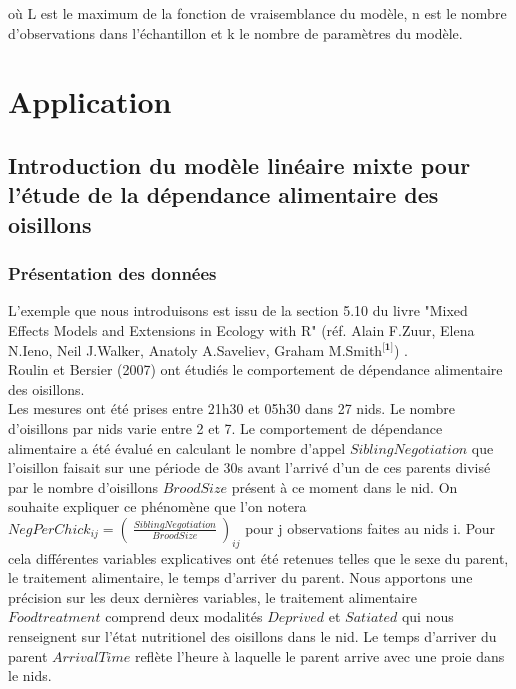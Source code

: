 \documentclass[11pt,fleqn]{book} %
\begin{document}
	où L est le maximum de la fonction de vraisemblance du modèle, n est le nombre d'observations dans l'échantillon et k le nombre de paramètres du modèle.
	
	
	
	\newpage
	
	
	
	\chapter{Application}
	
	
	\section{Introduction du modèle linéaire mixte pour l'étude de la dépendance alimentaire des oisillons}
	
	\vspace{2em}
	
	\subsection{Présentation des données}
	
	\vspace{1em}
	
	L'exemple que nous introduisons est issu de la section 5.10 du livre "Mixed Effects Models and Extensions in Ecology with R" (réf. Alain F.Zuur, Elena N.Ieno, Neil J.Walker, Anatoly A.Saveliev, Graham M.Smith$^{\textbf{[1]}}$) .\\ 
	Roulin et Bersier (2007) ont étudiés le comportement de dépendance alimentaire des oisillons.\\
	Les mesures ont été prises entre 21h30 et 05h30 dans 27 nids. Le nombre d'oisillons par nids varie entre 2 et 7. Le comportement de dépendance alimentaire a été évalué en calculant le nombre d'appel $SiblingNegotiation$ que l'oisillon faisait sur une période de 30s avant l'arrivé d'un de ces parents divisé par le nombre d'oisillons $BroodSize$ présent à ce moment dans le nid. On souhaite expliquer ce phénomène que l'on notera $NegPerChick_{ij}=\left(\:\frac{SiblingNegotiation}{BroodSize}\:\right)_{ij}$ pour j observations faites au nids i. Pour cela différentes variables explicatives ont été retenues telles que le sexe du parent, le traitement alimentaire, le temps d'arriver du parent. Nous apportons une précision sur les deux dernières variables, le traitement alimentaire $Foodtreatment$ comprend deux modalités $Deprived$ et $Satiated$ qui nous renseignent sur l'état nutritionel des oisillons dans le nid. Le temps d'arriver du parent $ArrivalTime$  reflète l'heure à laquelle le parent arrive avec une proie dans le nids.
	
\end{document}
